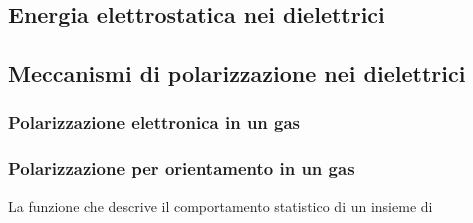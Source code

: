 \documentclass[x11names]{report}
\begin{document}
\subsection{Energia elettrostatica nei dielettrici}

\subsection{Meccanismi di polarizzazione nei dielettrici}
\subsubsection{Polarizzazione elettronica in un gas}
\subsubsection{Polarizzazione per orientamento in un gas}
La funzione che descrive il comportamento statistico di un insieme di 
\end{document}
